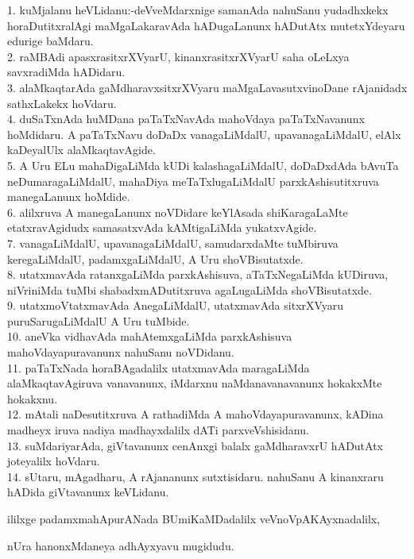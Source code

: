 \documentclass{article}
\begin{document}
1. kuMjalanu heVLidanu:-deVveMdarxnige samanAda nahuSanu yudadhxkekx horaDutitxralAgi maMgaLakaravAda hADugaLanunx hADutAtx mutetxYdeyaru edurige baMdaru.\\
2. raMBAdi apasxrasitxrXVyarU, kinanxrasitxrXVyarU saha oLeLxya savxradiMda hADidaru.\\
3. alaMkaqtarAda gaMdharavxsitxrXVyaru maMgaLavasutxvinoDane rAjanidadx sathxLakekx hoVdaru.\\
4. duSaTxnAda huMDana paTaTxNavAda mahoVdaya paTaTxNavanunx hoMdidaru. A paTaTxNavu doDaDx vanagaLiMdalU, upavanagaLiMdalU, elAlx kaDeyalUlx alaMkaqtavAgide.\\
5. A Uru ELu mahaDigaLiMda kUDi kalashagaLiMdalU, doDaDxdAda bAvuTa neDumaragaLiMdalU, mahaDiya meTaTxlugaLiMdalU parxkAshisutitxruva manegaLanunx hoMdide.\\
6. alilxruva A manegaLanunx noVDidare keYlAsada shiKaragaLaMte etatxravAgidudx samasatxvAda kAMtigaLiMda yukatxvAgide.\\
7. vanagaLiMdalU, upavanagaLiMdalU, samudarxdaMte tuMbiruva keregaLiMdalU, padamxgaLiMdalU, A Uru shoVBisutatxde.\\
8. utatxmavAda ratanxgaLiMda parxkAshisuva, aTaTxNegaLiMda kUDiruva, niVriniMda tuMbi shabadxmADutitxruva agaLugaLiMda shoVBisutatxde.\\
9. utatxmoVtatxmavAda AnegaLiMdalU, utatxmavAda sitxrXVyaru puruSarugaLiMdalU A Uru tuMbide.\\
10. aneVka vidhavAda mahAtemxgaLiMda parxkAshisuva mahoVdayapuravanunx nahuSanu noVDidanu.\\
11. paTaTxNada horaBAgadalilx utatxmavAda maragaLiMda alaMkaqtavAgiruva vanavanunx, iMdarxnu naMdanavanavanunx hokakxMte hokakxnu.\\
12. mAtali naDesutitxruva A rathadiMda A mahoVdayapuravanunx, kADina madheyx iruva nadiya madhayxdalilx dATi parxveVshisidanu.\\
13. suMdariyarAda, giVtavanunx cenAnxgi balalx gaMdharavxrU hADutAtx joteyalilx hoVdaru.\\
14. sUtaru, mAgadharu, A rAjananunx sutxtisidaru. nahuSanu A kinanxraru hADida giVtavanunx keVLidanu.

\begin{center}
ililxge padamxmahApurANada BUmiKaMDadalilx veVnoVpAKAyxnadalilx,
\end{center}

\begin{center}
nUra hanonxMdaneya adhAyxyavu mugidudu.
\end{center}
\end{document}
